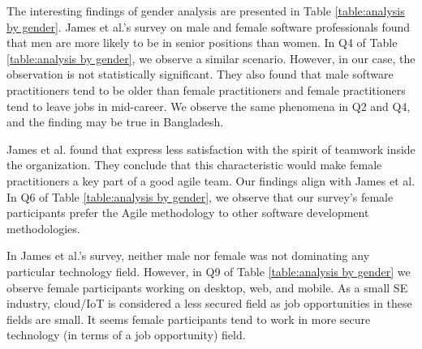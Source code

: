

The interesting findings of gender analysis are presented in Table \ref{table:analysis by gender}. James et al.'s\cite{James2017} survey on male and female software professionals found that men are more likely to be in senior positions than women. In Q4 of Table \ref{table:analysis by gender}, we observe a similar scenario. However, in our case, the observation is not statistically significant. They also found that male software practitioners tend to be older than female practitioners and female practitioners tend to leave jobs in mid-career. We observe the same phenomena in Q2 and Q4, and the finding may be true in Bangladesh.


James et al.\cite{James2017} found that express less satisfaction with the spirit of teamwork inside the organization. They conclude that this characteristic would make female practitioners a key part of a good agile team. Our findings align with James et al\cite{James2017}. In Q6  of Table \ref{table:analysis by gender}, we observe that our survey's female participants prefer the Agile methodology to other software development methodologies. 

In James et al.'s survey, neither male nor female was not dominating any particular technology field. However, in Q9 of 
Table \ref{table:analysis by gender} we observe female participants working on desktop, web, and mobile. As a small SE industry, cloud/IoT is considered a less secured field as job opportunities in these fields are small. It seems female participants tend to work in more secure technology (in terms of a job opportunity) field.
